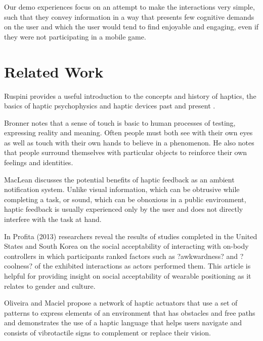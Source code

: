 \documentclass{chi-ext}
\begin{document}
Our demo experiences focus on an attempt to make the interactions very simple, such that they convey information in a way that presents few cognitive demands on the user and which the user would tend to find enjoyable and engaging, even if they were not participating in a mobile game. 


\section{Related Work}

Ruspini provides a useful introduction to the concepts and history of haptics, the basics of haptic psychophysics and haptic devices past and present \cite{ruspini1999haptics}.

Bronner notes that a sense of touch is basic to human processes of testing, expressing reality and meaning. Often people must both see with their own eyes as well as touch with their own hands to believe in a phenomenon\cite{bronner1982haptic}. He also notes that people surround themselves with particular objects to reinforce their own feelings and identities. 

MacLean \cite{maclean2009putting} discusses the potential benefits of haptic feedback as an ambient notification system. Unlike visual information, which can be obtrusive while completing a task, or sound, which can be obnoxious in a public environment, haptic feedback is usually experienced only by the user and does not directly interfere with the task at hand. 

In Profita (2013) \cite{profita2013don} researchers reveal the results of studies completed in the United States and South Korea on the social acceptability of interacting with on-body controllers in which participants  ranked factors such as ?awkwardness? and ?coolness? of the exhibited interactions as actors performed them. This article is helpful for providing insight on social acceptability of wearable positioning as it relates to gender and culture.

Oliveira and Maciel propose a network of haptic actuators that use a set of patterns to express elements of an environment that has obstacles and free paths and demonstrates the use of a haptic language that helps users navigate and consists of vibrotactile signs to complement or replace their vision. \cite{Jesus-Oliveira:2013aa}
\end{document}
